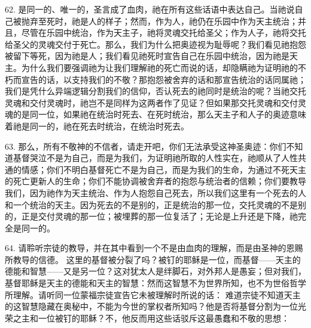 62. 是同一的、唯一的，圣言成了血肉，祂在所有这些话语中表达自己。当祂说自己被抛弃至死时，祂是人的样子；然而，作为人，祂仍在乐园中作为天主统治；并且，尽管在乐园中统治，作为天主子，祂将灵魂交托给圣父；作为人子，祂将交托给圣父的灵魂交付于死亡。那么，我们为什么把奥迹视为耻辱呢？我们看见祂抱怨被留下等死，因为祂是人；我们看见祂死时宣告自己在乐园中统治，因为祂是天主。为什么我们要强调祂为让我们理解祂的死亡而说的话，却隐瞒祂为证明祂的不朽而宣告的话，以支持我们的不敬？那抱怨被舍弃的话和那宣告统治的话同属祂；我们是凭什么异端逻辑分割我们的信仰，否认死去的祂同时是统治的呢？当祂交托灵魂和交付灵魂时，祂岂不是同样为这两者作了见证？但如果那交托灵魂和交付灵魂的是同一位，如果祂在统治时死去、在死时统治，那么天主子和人子的奥迹意味着祂是同一的，祂在死去时统治，在统治时死去。\par

63. 那么，所有不敬神的不信者，请走开吧，你们无法承受这神圣奥迹：你们不知道基督哭泣不是为自己，而是为我们，为证明祂所取的人性实在，祂顺从了人性共通的情感；你们不明白基督死亡不是为自己，而是为我们的生命，为通过不死天主的死亡更新人的生命；你们不能协调被舍弃者的抱怨与统治者的信赖；你们要教导我们，因为祂作为天主统治、作为人抱怨自己死去，所以我们这里有一个死去的人和一个统治的天主。因为死去的不是别的，正是统治的那一位，交托灵魂的不是别的，正是交付灵魂的那一位；被埋葬的那一位复活了；无论是上升还是下降，祂完全是同一的。\par

64. 请聆听宗徒的教导，并在其中看到一个不是由血肉的理解，而是由圣神的恩赐所教导的信德。 这里的基督被分裂了吗？被钉的耶稣是一位，而基督——天主的德能和智慧——又是另一位？这对犹太人是绊脚石，对外邦人是愚妄；但对我们，基督耶稣是天主的德能和天主的智慧：然而这智慧不为世界所知，也不为世俗哲学所理解。请听同一位蒙福宗徒宣告它未被理解时所说的话： 难道宗徒不知道天主的这智慧隐藏在奥秘中，不能为今世的掌权者所知吗？他是否将基督分割为一位光荣之主和一位被钉的耶稣？不，他反而用这些话驳斥这最愚蠢和不敬的思想：\par

